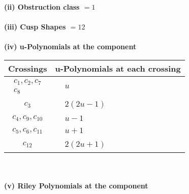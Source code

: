 \documentclass[1p]{elsarticle_modified}
\theoremstyle{definition}
\begin{document}
\flushleft \textbf{(ii) Obstruction class $= 1$}\\~\\
\flushleft \textbf{(iii) Cusp Shapes $= 12$}\\~\\
\newpage\renewcommand{\arraystretch}{1}
\flushleft \textbf{(iv) u-Polynomials at the component}\newline \\
\begin{tabular}{m{50pt}|m{274pt}}
Crossings & \hspace{64pt}u-Polynomials at each crossing \\
\hline $$\begin{aligned}c_{1},c_{2},c_{7}\\c_{8}\end{aligned}$$&$\begin{aligned}
&u
\end{aligned}$\\
\hline $$\begin{aligned}c_{3}\end{aligned}$$&$\begin{aligned}
&2(2 u-1)
\end{aligned}$\\
\hline $$\begin{aligned}c_{4},c_{9},c_{10}\end{aligned}$$&$\begin{aligned}
&u-1
\end{aligned}$\\
\hline $$\begin{aligned}c_{5},c_{6},c_{11}\end{aligned}$$&$\begin{aligned}
&u+1
\end{aligned}$\\
\hline $$\begin{aligned}c_{12}\end{aligned}$$&$\begin{aligned}
&2(2 u+1)
\end{aligned}$\\
\hline
\end{tabular}\\~\\
\newpage\renewcommand{\arraystretch}{1}
\flushleft \textbf{(v) Riley Polynomials at the component}\newline \\
\end{document}
